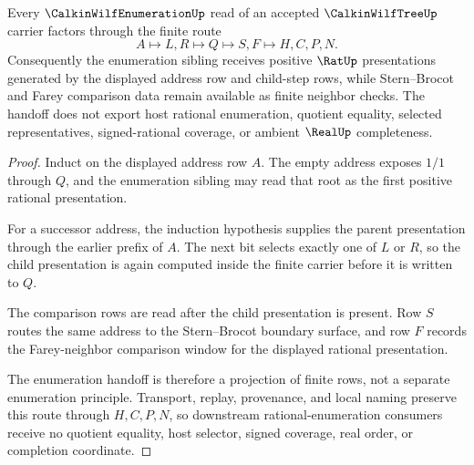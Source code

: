 \begin{theorem}
\label{thm:calkin-wilf-tree-rat-enumeration-handoff}
Every $\CalkinWilfEnumerationUp$ read of an accepted $\CalkinWilfTreeUp$ carrier factors through the finite route
$$
A \longmapsto L,R \longmapsto Q \longmapsto S,F \longmapsto H,C,P,N .
$$
Consequently the enumeration sibling receives positive $\RatUp$ presentations generated by the displayed address row and child-step rows, while Stern--Brocot and Farey comparison data remain available as finite neighbor checks. The handoff does not export host rational enumeration, quotient equality, selected representatives, signed-rational coverage, or ambient $\RealUp$ completeness.
\end{theorem}
\begin{proof}
Induct on the displayed address row $A$. The empty address exposes $1/1$ through $Q$, and the enumeration sibling may read that root as the first positive rational presentation.

For a successor address, the induction hypothesis supplies the parent presentation through the earlier prefix of $A$. The next bit selects exactly one of $L$ or $R$, so the child presentation is again computed inside the finite carrier before it is written to $Q$.

The comparison rows are read after the child presentation is present. Row $S$ routes the same address to the Stern--Brocot boundary surface, and row $F$ records the Farey-neighbor comparison window for the displayed rational presentation.

The enumeration handoff is therefore a projection of finite rows, not a separate enumeration principle. Transport, replay, provenance, and local naming preserve this route through $H,C,P,N$, so downstream rational-enumeration consumers receive no quotient equality, host selector, signed coverage, real order, or completion coordinate.
\end{proof}

